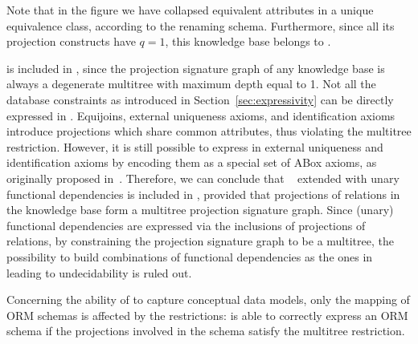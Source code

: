 \documentclass[draft]{article}
\newcommand{\pth}[2]{\ensuremath{\textsc{path}_{\mathscr{T}}(#1,#2)}\xspace}
\begin{document}
%
Note that in the figure we have collapsed equivalent attributes in a unique equivalence class, according to the renaming schema. Furthermore, since all its projection constructs have $q=1$, this knowledge base belongs to \DLRpm.
%

\DLR is included in \DLRpm, since the projection signature graph of any \DLR knowledge base is always a degenerate multitree with maximum depth equal to 1. 
%
Not all the database constraints as introduced in Section~\ref{sec:expressivity} can be directly expressed in \DLRpm. Equijoins, external uniqueness axioms, and identification axioms introduce projections which share common attributes, thus violating the multitree restriction. However, it is still possible to express in \DLRpm external uniqueness and identification axioms by encoding them as a special set of ABox axioms, as originally proposed in~\cite{CalvaneseGL01}. Therefore, we can conclude that \DLRID~\cite{CalvaneseGL01} extended with unary functional dependencies is included in \DLRpm{}\negmedspace, provided that projections of relations in the knowledge base form a multitree projection signature graph. Since (unary) functional dependencies are expressed via the inclusions of projections of relations, by constraining the projection signature graph to be a multitree, the possibility to build combinations of functional dependencies as the ones in~\cite{CalvaneseGL01} leading to undecidability is ruled out.

Concerning the ability of \DLRpm to capture conceptual data models, only the mapping of ORM schemas is affected by the \DLRpm restrictions: \DLRpm is able to correctly express an ORM schema if the projections involved in the schema satisfy the \DLRpm multitree restriction.

\end{document}
